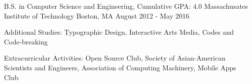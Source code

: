 \begin{cventries}
  \cventry
    {B.S. in Computer Science and Engineering, Cumulative GPA: 4.0}
    {Massachusates Institute of Technology}
    {Boston, MA}
    {August 2012 - May 2016}
    {
      \begin{cvitems}
        \item{Additional Studies: Typographic Design, Interactive Arts Media, Codes and Code-breaking}
        \item {Extracurricular Activities: Open Source Club, Society of Asian-American Scientists and Engineers, Association of Computing Machinery, Mobile Apps Club}
      \end{cvitems}
    }
\end{cventries}
